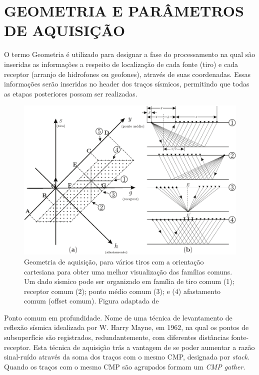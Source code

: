 
\section{GEOMETRIA E PARÂMETROS DE AQUISIÇÃO}

O termo Geometria é utilizado para designar a fase do processamento na qual são inseridas as informações a respeito de localização de cada fonte (tiro) e cada receptor (arranjo de hidrofones ou geofones), através de suas coordenadas. Essas informações serão inseridas no header dos traços sísmicos, permitindo que todas as etapas posteriores possam ser realizadas.

\begin{figure}[H]
\centering
\includegraphics[width=12cm]{figuras/cap2/geometria.pdf}
\caption{Geometria de aquisição, para vários tiros com a orientação cartesiana para obter uma melhor visualização das famílias comuns. Um dado sísmico pode ser organizado em família de tiro comum (1); receptor comum (2); ponto médio comum (3); e (4) afastamento comum (offset comum). Figura adaptada de \citep{Yilmaz(2000)}}
\label{fig:geometria_cdp}
\end{figure}

Ponto comum em profundidade. Nome de uma técnica de levantamento de reflexão sísmica idealizada por W. Harry Mayne, em 1962, na qual os pontos de subsuperfície são registrados, redundantemente, com diferentes distâncias fonte-receptor. Esta técnica de aquisição trás a vantagem de se poder aumentar a razão sinal-ruído através da soma dos traços com o mesmo CMP, designada por \textit{stack}. Quando os traços com o mesmo CMP são agrupados formam um \textit{CMP gather}. 

